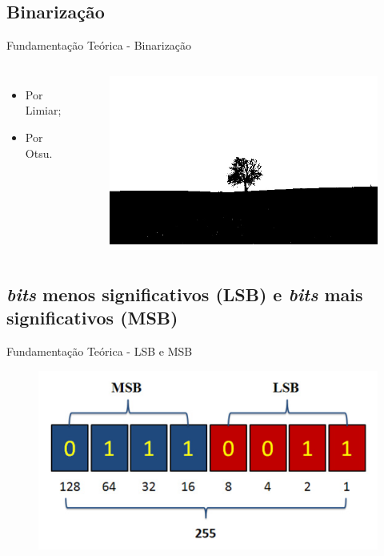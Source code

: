 \documentclass[]{beamer}
\begin{document}
\subsection{Binarização}

\begin{frame}{Fundamentação Teórica - Binarização}
    \begin{columns}
            \begin{itemize}
                  \item Por Limiar;
                  \item Por Otsu.
            \end{itemize}
            \begin{figure}
                 \includegraphics[scale=0.4]{Imagens/resultado_threshold.png}
            \end{figure}
    \end{columns}    
\end{frame}

\subsection{\textit{bits} menos significativos (LSB) e \textit{bits} mais significativos (MSB)}

\begin{frame}{Fundamentação Teórica - LSB e MSB}
    \begin{figure}
        \includegraphics[scale=0.6]{Imagens/lsb_msb_fig.png}
    \end{figure}  
\end{frame}
\end{document}
